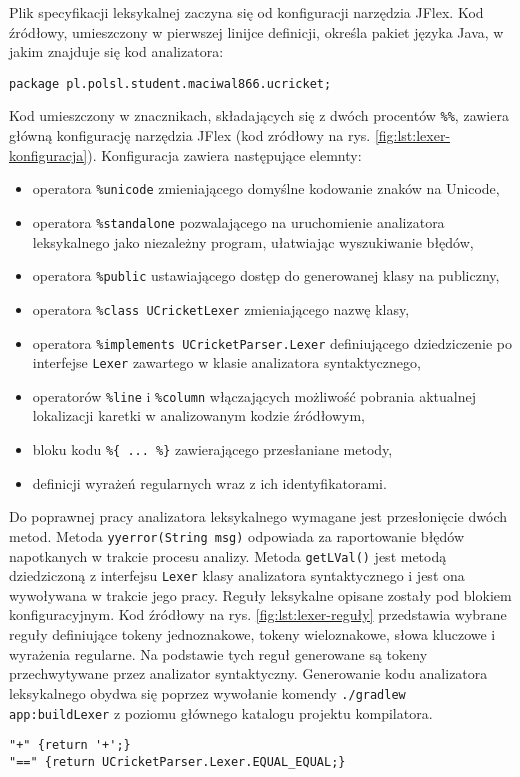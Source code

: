 Plik specyfikacji leksykalnej zaczyna się od konfiguracji narzędzia JFlex. Kod źródłowy, umieszczony w pierwszej linijce definicji, określa pakiet języka Java, w jakim znajduje się kod analizatora:
\begin{lstlisting}
package pl.polsl.student.maciwal866.ucricket;
\end{lstlisting}
Kod umieszczony w znacznikach, składających się z dwóch procentów \lstinline|%%|, zawiera główną konfigurację narzędzia JFlex (kod zródłowy na rys. \ref{fig:lst:lexer-konfiguracja}). Konfiguracja zawiera następujące elemnty:
\begin{itemize}
\item operatora \lstinline|%unicode| zmieniającego domyślne kodowanie znaków na Unicode,
\item operatora \lstinline|%standalone| pozwalającego na uruchomienie analizatora leksykalnego jako niezależny program, ułatwiając wyszukiwanie błędów,
\item operatora \lstinline|%public| ustawiającego dostęp do generowanej klasy na publiczny,
\item operatora \lstinline|%class UCricketLexer| zmieniającego nazwę klasy,
\item operatora \lstinline|%implements UCricketParser.Lexer| definiującego dziedziczenie po interfejse \lstinline|Lexer| zawartego w klasie analizatora syntaktycznego,
\item operatorów \lstinline|%line| i \lstinline|%column| włączających możliwość pobrania aktualnej lokalizacji karetki w analizowanym kodzie źródłowym,
\item bloku kodu \lstinline|%{ ... %}| zawierającego przesłaniane metody,
\item definicji wyrażeń regularnych wraz z ich identyfikatorami.
\end{itemize}
Do poprawnej pracy analizatora leksykalnego wymagane jest przesłonięcie dwóch metod. Metoda \lstinline|yyerror(String msg)| odpowiada za raportowanie błędów napotkanych w trakcie procesu analizy. Metoda \lstinline|getLVal()| jest metodą dziedziczoną z interfejsu \lstinline|Lexer| klasy analizatora syntaktycznego i jest ona wywoływana w trakcie jego pracy.
Reguły leksykalne opisane zostały pod blokiem konfiguracyjnym. Kod źródłowy na rys. \ref{fig:lst:lexer-reguły} przedstawia wybrane reguły definiujące tokeny jednoznakowe, tokeny wieloznakowe, słowa kluczowe i wyrażenia regularne. Na podstawie tych reguł generowane są tokeny przechwytywane przez analizator syntaktyczny.
Generowanie kodu analizatora leksykalnego obydwa się poprzez wywołanie komendy \lstinline|./gradlew app:buildLexer| z poziomu głównego katalogu projektu kompilatora.
\begin{lstlisting}
"+" {return '+';}
"==" {return UCricketParser.Lexer.EQUAL_EQUAL;}
\end{lstlisting}


